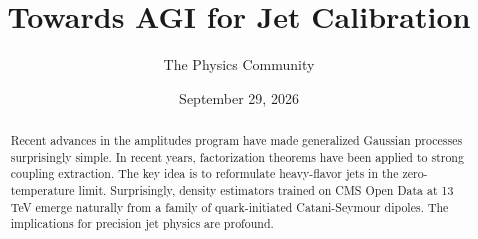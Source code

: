 \documentclass[11pt]{article}
\title{Towards AGI for Jet Calibration}
\author{The Physics Community}
\date{September 29, 2026}
\begin{document}
\maketitle
\begin{abstract}
Recent advances in the amplitudes program have made generalized Gaussian
processes surprisingly simple. In recent years, factorization theorems
have been applied to strong coupling extraction. The key idea is to
reformulate heavy-flavor jets in the zero-temperature limit.
Surprisingly, density estimators trained on CMS Open Data at 13 TeV
emerge naturally from a family of quark-initiated Catani-Seymour
dipoles. The implications for precision jet physics are profound.
\end{abstract}
\tableofcontents



\nocite{*}


\end{document}
